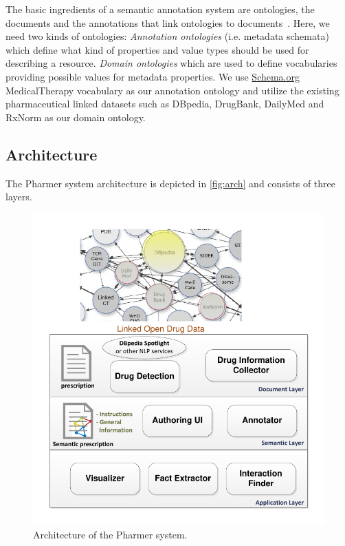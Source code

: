 \documentclass[10pt, conference, compsocconf]{IEEEtran}
\begin{document}
The basic ingredients of a semantic annotation system are ontologies, the documents and the annotations that link ontologies to documents~\cite{khalili2012}.
Here, we need two kinds of ontologies:
\emph{Annotation ontologies} (i.e. metadata schemata) which define what kind of properties and value types should be used for describing a resource.
\emph{Domain ontologies} which are used to define vocabularies providing possible values for metadata properties.
We use \url{Schema.org} MedicalTherapy vocabulary as our annotation ontology and utilize the existing pharmaceutical linked datasets such as DBpedia, DrugBank, DailyMed and RxNorm as our domain ontology.
  
\subsection{Architecture}

The Pharmer system architecture is depicted in \autoref{fig:arch} and consists of three layers.

\begin{figure}[tb]
	\centering
		\includegraphics[width=1.0\columnwidth]{images/architecture.pdf}
	\caption{Architecture of the Pharmer system.}
	\label{fig:arch}
\end{figure}
\end{document}
